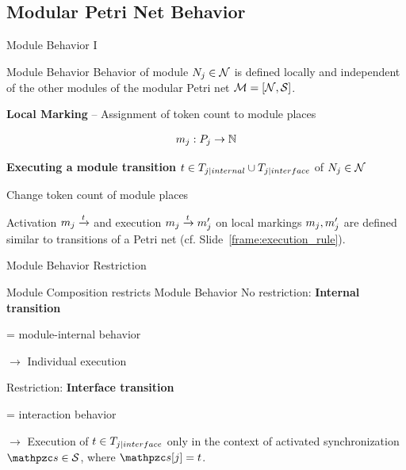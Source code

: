 \documentclass[11pt]{presentation}
\begin{document}
\subsection{Modular Petri Net Behavior}

\begin{frame}{Module Behavior I}

	\begin{merke}{Module Behavior}{}
		Behavior of module $ \module{j} \in \modules $ is defined locally and independent of the other modules of the modular Petri net $ \ms[=] $.
	\end{merke}

	\bigskip
	\textbf{Local Marking} -- Assignment of token count to module places

	\begin{align*}
		\localmarking{j}: P_j \rightarrow \nat
	\end{align*}


	\textbf{Executing a module transition} $ t \in \internals[j] \cup \interfaces[j] $ of $ \module{j} \in \modules $

	Change token count of module places

	Activation $ \localmarking{j} \xrightarrow{t} $ and execution
	$ \localmarking{j} \xrightarrow{t} \localmarking{j}^\prime $ on local markings $ \localmarking{j}, \localmarking{j}^\prime $ are defined similar to transitions of a Petri net (cf. Slide~\ref{frame:execution_rule}).
\end{frame}

\begin{frame}{Module Behavior Restriction}
	\begin{merke}{Module Composition restricts Module Behavior}{}
		No restriction:
		\textbf{Internal transition}

		= module-internal behavior

		$ \rightarrow $ Individual execution

		\bigskip
		Restriction:
		\textbf{Interface transition}

		= interaction behavior

		$ \rightarrow $ Execution of $ t \in \interfaces[j] $ only in the context of activated synchronization $ \synchronization \in \synchronizations $, where $ \synchronization[j] = t $.
	\end{merke}
\end{frame}
\end{document}
